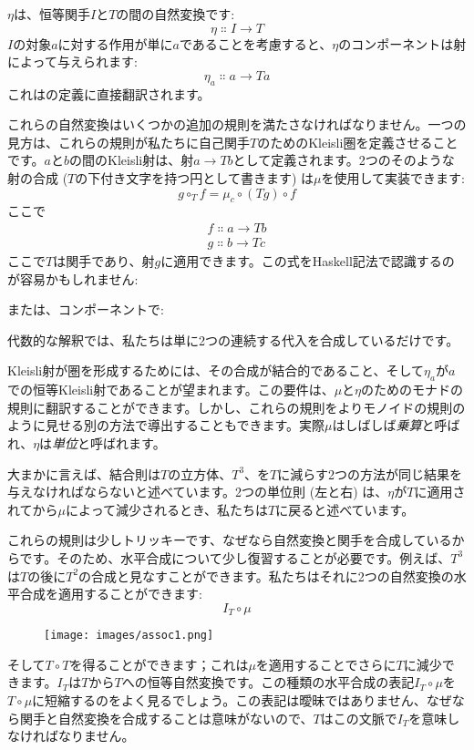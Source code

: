$\eta$は、恒等関手$I$と$T$の間の自然変換です: 
\[\eta \Colon I \to T\]
$I$の対象$a$に対する作用が単に$a$であることを考慮すると、$\eta$のコンポーネントは射によって与えられます: 
\[\eta_a \Colon a \to T a\]
これはの定義に直接翻訳されます。

これらの自然変換はいくつかの追加の規則を満たさなければなりません。一つの見方は、これらの規則が私たちに自己関手$T$のためのKleisli圏を定義させることです。$a$と$b$の間のKleisli射は、射$a \to T b$として定義されます。2つのそのような射の合成 ($T$の下付き文字を持つ円として書きます) は$\mu$を使用して実装できます: 
\[g \circ_T f = \mu_c \circ (T g) \circ f\]
ここで
\begin{gather*}
  f \Colon a \to T b \\
  g \Colon b \to T c
\end{gather*}
ここで$T$は関手であり、射$g$に適用できます。この式をHaskell記法で認識するのが容易かもしれません: 

または、コンポーネントで: 

代数的な解釈では、私たちは単に2つの連続する代入を合成しているだけです。

Kleisli射が圏を形成するためには、その合成が結合的であること、そして$\eta_a$が$a$での恒等Kleisli射であることが望まれます。この要件は、$\mu$と$\eta$のためのモナドの規則に翻訳することができます。しかし、これらの規則をよりモノイドの規則のように見せる別の方法で導出することもできます。実際$\mu$はしばしば\emph{乗算}と呼ばれ、$\eta$は\emph{単位}と呼ばれます。

大まかに言えば、結合則は$T$の立方体、$T^3$、を$T$に減らす2つの方法が同じ結果を与えなければならないと述べています。2つの単位則 (左と右) は、$\eta$が$T$に適用されてから$\mu$によって減少されるとき、私たちは$T$に戻ると述べています。

これらの規則は少しトリッキーです、なぜなら自然変換と関手を合成しているからです。そのため、水平合成について少し復習することが必要です。例えば、$T^3$は$T$の後に$T^2$の合成と見なすことができます。私たちはそれに2つの自然変換の水平合成を適用することができます: 
\[I_T \circ \mu\]

\begin{figure}[H]
  \centering
  \texttt{[image: images/assoc1.png]}
\end{figure}

\noindent
そして$T \circ T$を得ることができます；これは$\mu$を適用することでさらに$T$に減少できます。$I_T$は$T$から$T$への恒等自然変換です。この種類の水平合成の表記$I_T \circ \mu$を$T \circ \mu$に短縮するのをよく見るでしょう。この表記は曖昧ではありません、なぜなら関手と自然変換を合成することは意味がないので、$T$はこの文脈で$I_T$を意味しなければなりません。

